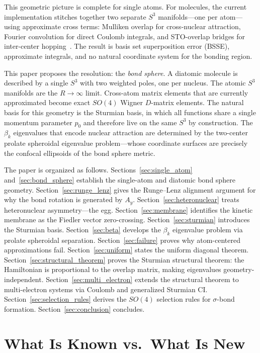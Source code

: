 \documentclass[aps,pra,twocolumn,superscriptaddress,longbibliography]{revtex4-2}
\begin{document}
This geometric picture is complete for single atoms.  For molecules, the
current implementation stitches together two separate $S^3$
manifolds---one per atom---using approximate cross terms: Mulliken overlap
for cross-nuclear attraction, Fourier convolution for direct Coulomb
integrals, and STO-overlap bridges for inter-center
hopping~\cite{loutey_fci}.  The result is basis set superposition error
(BSSE), approximate integrals, and no natural coordinate system for the
bonding region.

This paper proposes the resolution: the \emph{bond sphere}.  A diatomic
molecule is described by a single $S^3$ with two weighted poles, one per
nucleus.  The atomic $S^3$ manifolds are the $R \to \infty$ limit.
Cross-atom matrix elements that are currently approximated become exact
$SO(4)$ Wigner $D$-matrix elements.  The natural basis for this geometry
is the Sturmian basis, in which all functions share a single momentum
parameter $p_0$ and therefore live on the same $S^3$ by construction.
The $\beta_k$ eigenvalues that encode nuclear attraction are determined
by the two-center prolate spheroidal eigenvalue problem---whose coordinate
surfaces are precisely the confocal ellipsoids of the bond sphere metric.

The paper is organized as follows.  Sections~\ref{sec:single_atom}
and~\ref{sec:bond_sphere} establish the single-atom and diatomic bond
sphere geometry.  Section~\ref{sec:runge_lenz} gives the Runge--Lenz
alignment argument for why the bond rotation is generated by $A_y$.
Section~\ref{sec:heteronuclear} treats heteronuclear asymmetry---the
egg.  Section~\ref{sec:membrane} identifies the kinetic membrane as
the Fiedler vector zero-crossing.  Section~\ref{sec:sturmian} introduces
the Sturmian basis.  Section~\ref{sec:beta} develops the $\beta_k$
eigenvalue problem via prolate spheroidal separation.
Section~\ref{sec:failure} proves why atom-centered approximations fail.
Section~\ref{sec:uniform} states the uniform diagonal theorem.
Section~\ref{sec:structural_theorem} proves the Sturmian structural
theorem: the Hamiltonian is proportional to the overlap matrix, making
eigenvalues geometry-independent.
Section~\ref{sec:multi_electron} extends the structural theorem to
multi-electron systems via Coulomb and generalized Sturmian CI.
Section~\ref{sec:selection_rules} derives the $SO(4)$ selection rules
for $\sigma$-bond formation.
Section~\ref{sec:conclusion} concludes.


\section{What Is Known vs.\ What Is New}
\label{sec:attribution}
\end{document}
